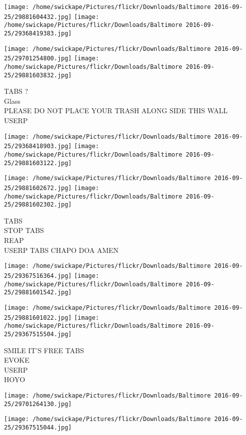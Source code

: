 \documentclass[10pt,letterpaper]{article}
\begin{document}
\texttt{[image: /home/swickape/Pictures/flickr/Downloads/Baltimore 2016-09-25/29881604432.jpg]}
\texttt{[image: /home/swickape/Pictures/flickr/Downloads/Baltimore 2016-09-25/29368419383.jpg]}

\texttt{[image: /home/swickape/Pictures/flickr/Downloads/Baltimore 2016-09-25/29701254800.jpg]}
\texttt{[image: /home/swickape/Pictures/flickr/Downloads/Baltimore 2016-09-25/29881603832.jpg]}

TABS ?\\
Glass\\
PLEASE DO NOT PLACE YOUR TRASH ALONG SIDE THIS WALL\\
USERP\\
\pagebreak

\texttt{[image: /home/swickape/Pictures/flickr/Downloads/Baltimore 2016-09-25/29368418903.jpg]}
\texttt{[image: /home/swickape/Pictures/flickr/Downloads/Baltimore 2016-09-25/29881603122.jpg]}

\texttt{[image: /home/swickape/Pictures/flickr/Downloads/Baltimore 2016-09-25/29881602672.jpg]}
\texttt{[image: /home/swickape/Pictures/flickr/Downloads/Baltimore 2016-09-25/29881602302.jpg]}

TABS\\
STOP TABS\\
REAP\\
USERP TABS CHAPO DOA AMEN\\
\pagebreak

\texttt{[image: /home/swickape/Pictures/flickr/Downloads/Baltimore 2016-09-25/29367516364.jpg]}
\texttt{[image: /home/swickape/Pictures/flickr/Downloads/Baltimore 2016-09-25/29881601542.jpg]}

\texttt{[image: /home/swickape/Pictures/flickr/Downloads/Baltimore 2016-09-25/29881601022.jpg]}
\texttt{[image: /home/swickape/Pictures/flickr/Downloads/Baltimore 2016-09-25/29367515504.jpg]}

SMILE IT'S FREE TABS\\
EVOKE\\
USERP\\
HOYO\\
\pagebreak

\texttt{[image: /home/swickape/Pictures/flickr/Downloads/Baltimore 2016-09-25/29701264130.jpg]}

\vspace{0.25in}
\texttt{[image: /home/swickape/Pictures/flickr/Downloads/Baltimore 2016-09-25/29367515044.jpg]}
\end{document}
